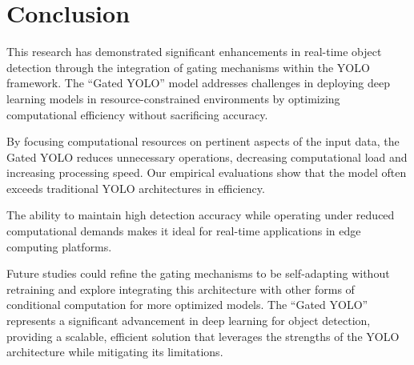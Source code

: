 \section{Conclusion}  

This research has demonstrated significant enhancements in real-time object detection through the integration of gating mechanisms within the YOLO framework. The ``Gated YOLO'' model addresses challenges in deploying deep learning models in resource-constrained environments by optimizing computational efficiency without sacrificing accuracy.

By focusing computational resources on pertinent aspects of the input data, the Gated YOLO reduces unnecessary operations, decreasing computational load and increasing processing speed. Our empirical evaluations show that the model often exceeds traditional YOLO architectures in efficiency.

The ability to maintain high detection accuracy while operating under reduced computational demands makes it ideal for real-time applications in edge computing platforms.

Future studies could refine the gating mechanisms to be self-adapting without retraining and explore integrating this architecture with other forms of conditional computation for more optimized models. The ``Gated YOLO'' represents a significant advancement in deep learning for object detection, providing a scalable, efficient solution that leverages the strengths of the YOLO architecture while mitigating its limitations.

\clearpage
